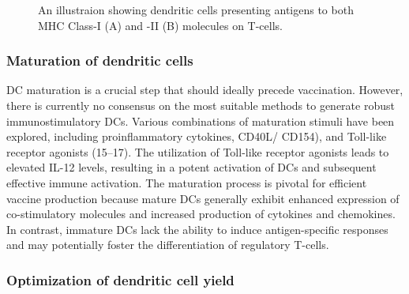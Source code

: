 \documentclass[
]{article}
\begin{document}
\begin{figure}


\caption{\label{fig-dc-present}An illustraion showing dendritic cells
presenting antigens to both MHC Class-I (A) and -II (B) molecules on
T-cells.}

\end{figure}%

\subsubsection{Maturation of dendritic
cells}\label{maturation-of-dendritic-cells}

DC maturation is a crucial step that should ideally precede vaccination.
However, there is currently no consensus on the most suitable methods to
generate robust immunostimulatory DCs. Various combinations of
maturation stimuli have been explored, including proinflammatory
cytokines, CD40L/ CD154), and Toll-like receptor agonists (15--17). The
utilization of Toll-like receptor agonists leads to elevated IL-12
levels, resulting in a potent activation of DCs and subsequent effective
immune activation. The maturation process is pivotal for efficient
vaccine production because mature DCs generally exhibit enhanced
expression of co-stimulatory molecules and increased production of
cytokines and chemokines. In contrast, immature DCs lack the ability to
induce antigen-specific responses and may potentially foster the
differentiation of regulatory T-cells.

\subsubsection{Optimization of dendritic cell
yield}\label{optimization-of-dendritic-cell-yield}
\end{document}

